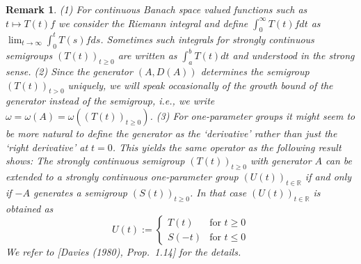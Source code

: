 \documentclass{article}
\newtheorem{remark}{Remark}
\begin{document}
\begin{remark}
(1) For continuous Banach space valued functions such as $t \mapsto T(t)f$ we consider the Riemann integral and define $\int_0^\infty T(t)f dt$ as $\lim_{t \to \infty} \int_0^t T(s)f ds$.
Sometimes such integrals for strongly continuous semigroups $(T(t))_{t \geq 0}$ are written as $\int_a^b T(t)dt$ and understood in the strong sense.
(2) Since the generator $(A,D(A))$ determines the semigroup $(T(t))_{t > 0}$ uniquely, we will speak occasionally of the growth bound of the generator instead of the semigroup, i.e., we write $\omega = \omega(A) = \omega((T(t))_{t \geq 0})$.
(3) For one-parameter groups it might seem to be more natural to define the generator as the `derivative' rather than just the `right derivative' at $t = 0$.
This yields the same operator as the following result shows:
The strongly continuous semigroup $(T(t))_{t \geq 0}$ with generator $A$ can be extended to a strongly continuous one-parameter group $(U(t))_{t \in \mathbb{R}}$ if and only if $-A$ generates a semigroup $(S(t))_{t \geq 0}$.
In that case $(U(t))_{t \in \mathbb{R}}$ is obtained as
\[
U(t) := \begin{cases}
T(t) & \text{for } t \geq 0 \\
S(-t) & \text{for } t \leq 0
\end{cases}
\]
We refer to [Davies (1980), Prop.~1.14] for the details.
\end{remark}
\end{document}
